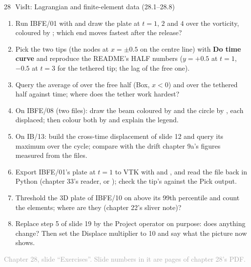 \documentclass[aspectratio=169,11pt]{beamer}
\newcommand{\sourcecredit}[1]{\vfill\begin{flushright}\tiny\textcolor{DarkGray}{#1}\end{flushright}}
\providecommand{\gui}[1]{\textsf{\textbf{#1}}}
\begin{document}
\begin{frame}{28\,\textbullet\ VisIt: Lagrangian and finite-element data (28.1--28.8)}
\label{fr:c28x1}
\footnotesize
\begin{enumerate}
  \item[28.1] Run IBFE/01 with  and draw the plate at $t = 1$, $2$ and $4$ over the vorticity, coloured by ; which end moves fastest after the release?
  \item[28.2] Pick the two tips (the nodes at $x = \pm 0.5$ on the centre line) with \gui{Do time curve} and reproduce the README's HALF numbers ($y = +0.5$ at $t = 1$, $-0.5$ at $t = 3$ for the tethered tip; the lag of the free one).
  \item[28.3] Query the average of  over the free half (Box, $x < 0$) and over the tethered half against time; where does the tether work hardest?
  \item[28.4] On IBFE/08 (two files): draw the beam coloured by  and the circle by , each displaced; then colour both by  and explain the legend.
  \item[28.5] On IB/13: build the cross-time displacement of slide 12 and query its maximum over the cycle; compare with the drift chapter 9a's figures measured from the  files.
  \item[28.6] Export IBFE/01's plate at $t = 1$ to VTK with  and , and read the file back in Python (chapter 33's reader, or ); check the tip's  against the Pick output.
  \item[28.7] Threshold the 3D plate of IBFE/10 on  above its 99th percentile and count the elements; where are they (chapter 22's sliver note)?
  \item[28.8] Replace step 5 of slide 19 by the Project operator on purpose: does anything change? Then set the Displace multiplier to 10 and say what the picture now shows.
\end{enumerate}
\sourcecredit{Chapter 28, slide ``Exercises''. Slide numbers in it are pages of chapter 28's PDF.}
\end{frame}
\end{document}

